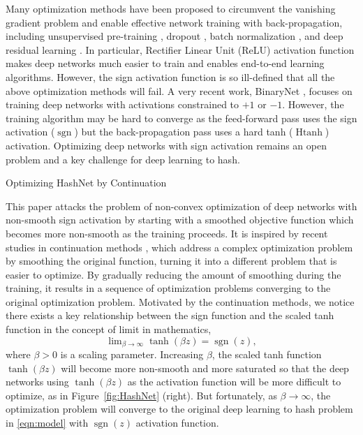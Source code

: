 \documentclass[10pt,twocolumn,letterpaper]{article}
\begin{document}
Many optimization methods have been proposed to circumvent the vanishing gradient problem and enable effective network training with back-propagation, including unsupervised pre-training \cite{cite:NC06DBN,cite:NIPS07LWT}, dropout \cite{cite:JMLR14Dropout}, batch normalization \cite{cite:ICML15BN}, and deep residual learning \cite{cite:CVPR16DRL}. In particular, Rectifier Linear Unit (ReLU) \cite{cite:ICML10ReLU} activation function makes deep networks much easier to train and enables end-to-end learning algorithms. However, the sign activation function is so ill-defined that all the above optimization methods will fail. A very recent work, BinaryNet \cite{cite:NIPS16BinaryNet}, focuses on training deep networks with activations constrained to $+1$ or $-1$. However, the training algorithm may be hard to converge as the feed-forward pass uses the sign activation ($\operatorname{sgn}$) but the back-propagation pass uses a hard tanh ($\operatorname{Htanh}$) activation. Optimizing deep networks with sign activation remains an open problem and a key challenge for deep learning to hash.

\begin{algorithm}[htbp]
    \DontPrintSemicolon
	\caption{Optimizing HashNet by Continuation}
	\label{algorithm:HashNet}
\end{algorithm}

This paper attacks the problem of non-convex optimization of deep networks with non-smooth sign activation by starting with a smoothed objective function which becomes more non-smooth as the training proceeds. It is inspired by recent studies in continuation methods \cite{cite:Book12Continuation}, which address a complex optimization problem by smoothing the original function, turning it into a different problem that is easier to optimize. By gradually reducing the amount of smoothing during the training, it results in a sequence of optimization problems converging to the original optimization problem.
Motivated by the continuation methods, we notice there exists a key relationship between the sign function and the scaled tanh function in the concept of limit in mathematics,
\begin{equation}\label{eqn:tanh}
	\mathop {\lim }\nolimits_{\beta  \to \infty } \tanh \left( {\beta z} \right) = \operatorname{sgn} \left( z \right),
\end{equation}
where $\beta>0$ is a scaling parameter. Increasing $\beta$, the scaled tanh function $\operatorname{tanh}(\beta z)$ will become more non-smooth and more saturated so that the deep networks using $\operatorname{tanh}(\beta z)$ as the activation function will be more difficult to optimize, as in Figure~\ref{fig:HashNet} (right). But fortunately, as $\beta \rightarrow \infty$, the optimization problem will converge to the original deep learning to hash problem in \eqref{eqn:model} with $\operatorname{sgn}(z)$ activation function.
\end{document}
